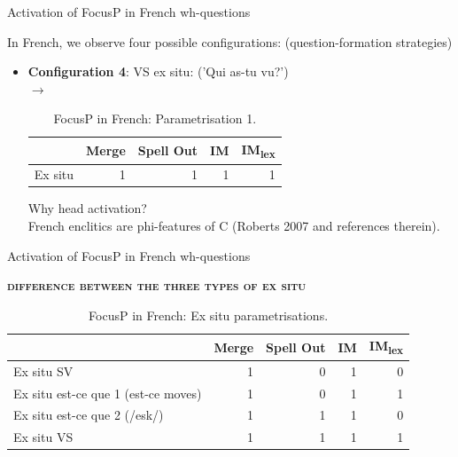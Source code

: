 \documentclass[lesson_slides]{subfiles}
\begin{document}
\begin{frame}[c]{Activation of FocusP in French wh-questions}

    In French, we observe four possible configurations: (question-formation strategies)
    \begin{itemize}
        \item[\ding{227}] \textbf{Configuration 4}: \pause VS ex situ: \pause ('Qui as-tu vu?')\\ \pause
        $\longrightarrow$  \pause
    \vspace*{2mm}
    \begin{table}[H]
    \centering
        \begin{tabular}{|l|r|r|r|r|}
        \hline
         & Merge & Spell Out & IM & IM\textsubscript{lex} \\
        \hline
        Ex situ & 1 & 1 & 1 & 1 \\
        \hline
        \end{tabular}
    \caption{\label{tab:samp}FocusP in French: Parametrisation 1.}
    \end{table} \pause

    \noindent Why head activation?\\ \pause
    French enclitics are phi-features of C (Roberts 2007 and references therein).
    \end{itemize}

\end{frame}
\begin{frame}{Activation of FocusP in French wh-questions}

    \noindent \textbf{\textsc{difference between the three types of ex situ}} \pause
    \vspace*{2mm}
    \begin{table}[H]
    \centering
        \begin{tabular}{|l|r|r|r|r|}
        \hline
         & Merge & Spell Out & IM & IM\textsubscript{lex} \\
         \hline
        Ex situ SV & 1 & 0 & 1 & 0 \\
        \hline
        Ex situ est-ce que 1 (est-ce moves) & 1 & 0 & 1 & 1 \\
        \hline
        Ex situ est-ce que 2 (/esk/) & 1 & 1 & 1 & 0 \\
        \hline
        Ex situ VS & 1 & 1 & 1 & 1 \\
        \hline
        \end{tabular}
    \caption{\label{tab:samp}FocusP in French: Ex situ parametrisations.}
    \end{table}
    
    
\end{frame}
\end{document}
